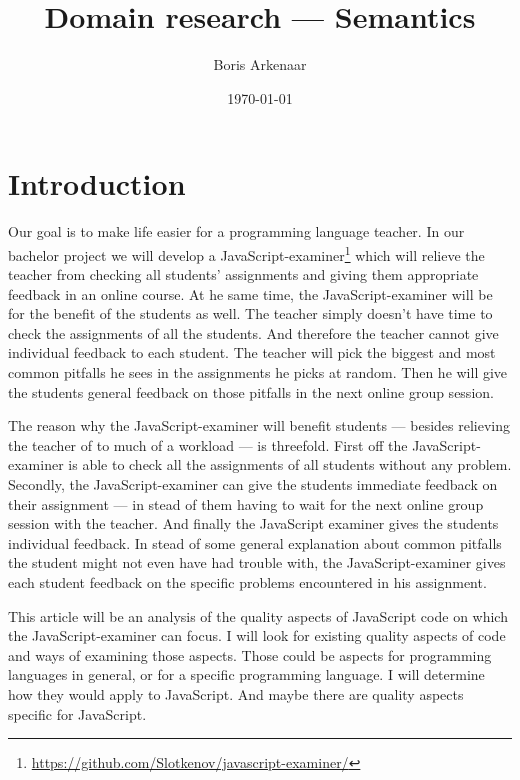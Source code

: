 \documentclass{article}
\begin{document}
 

\title{Domain research --- Semantics}
\author{Boris Arkenaar}
\date{\today}
\maketitle 


\section{Introduction} 

Our goal is to make life easier for a programming language teacher. In our
bachelor project we will develop a
JavaScript-examiner\footnote{\url{https://github.com/Slotkenov/javascript-examiner/}}
which will relieve the teacher from checking all students' assignments and
giving them appropriate feedback in an online course. At he same time, the
JavaScript-examiner will be for the benefit of the students as well. The
teacher simply doesn't have time to check the assignments of all the
students. And therefore the teacher cannot give individual feedback to each
student. The teacher will pick the biggest and most common pitfalls he sees in
the assignments he picks at random. Then he will give the students general
feedback on those pitfalls in the next online group session.

The reason why the JavaScript-examiner will benefit students --- besides
relieving the teacher of to much of a workload --- is threefold. 
First off the JavaScript-examiner is able to check all the assignments of all students
without any problem. Secondly, the JavaScript-examiner can give the students
immediate feedback on their assignment --- in stead of them having to wait for
the next online group session with the teacher. And finally the JavaScript
examiner gives the students individual feedback. In stead of some general
explanation about common pitfalls the student might not even have had trouble
with, the JavaScript-examiner gives each student feedback on the specific
problems encountered in his assignment.

This article will be an analysis of the quality aspects of JavaScript code on
which the JavaScript-examiner can focus. I will look for existing quality
aspects of code and ways of examining those aspects. Those could be aspects for
programming languages in general, or for a specific programming language. I
will determine how they would apply to JavaScript. And maybe there are quality
aspects specific for JavaScript.
\end{document}
